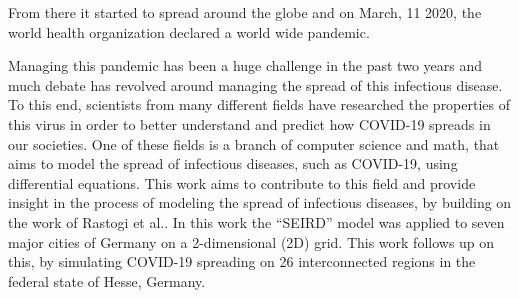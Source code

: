 From there it started to spread around the globe and on March, 11 2020, the world health organization declared a world wide pandemic\cite{??}.\newline
\par
Managing this pandemic has been a huge challenge in the past two years and much debate has revolved around managing the spread of this
infectious disease. To this end, scientists from many different fields have researched the properties of this virus in order to better
understand and predict how COVID-19 spreads in our societies. One of these fields is a branch of computer science and math, that aims to
model the spread of infectious diseases, such as  COVID-19, using differential equations. This work aims to contribute to this field and
provide insight in the process of modeling the spread of infectious diseases, by building on the work of Rastogi et al.\cite{rastogi}.
In this work the ``SEIRD'' model\cite{wittum} was applied to seven major cities of Germany on a 2-dimensional (2D) grid. This work
follows up on this, by simulating COVID-19 spreading on 26 interconnected regions in the federal state of Hesse, Germany.



%

